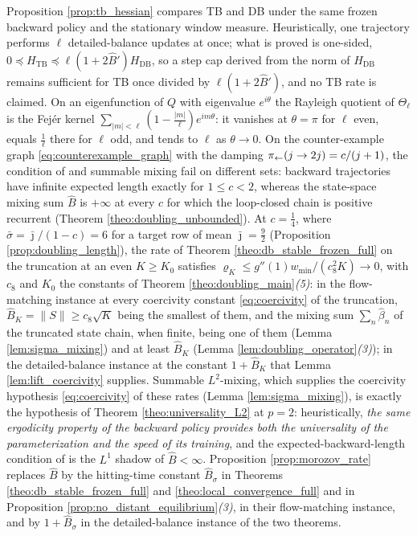 \begin{remark}\label{rem:tb_vs_db}
Proposition \ref{prop:tb_hessian} compares TB and DB under the same frozen backward policy and the stationary window measure. Heuristically, one trajectory performs $\ell$ detailed-balance updates at once; what is proved is one-sided, $0\preceq H_{\mathrm{TB}}\preceq\ell(1+2\widehat B')H_{\mathrm{DB}}$, so a step cap derived from the norm of $H_{\mathrm{DB}}$ remains sufficient for TB once divided by $\ell(1+2\widehat B')$, and no TB rate is claimed. On an eigenfunction of $Q$ with eigenvalue $e^{i\theta}$ the Rayleigh quotient of $\Theta_\ell$ is the Fej\'er kernel $\sum_{|m|<\ell}(1-\frac{|m|}\ell)e^{im\theta}$: it vanishes at $\theta=\pi$ for $\ell$ even, equals $\frac1\ell$ there for $\ell$ odd, and tends to $\ell$ as $\theta\rightarrow0$. On the counter-example graph \eqref{eq:counterexample_graph} with the damping $\pi_{\leftarrow}(j\rightarrow2j)=c/(j+1)$, the condition of \citet{morozov2025revisiting} and summable mixing fail on different sets: backward trajectories have infinite expected length exactly for $1\leq c<2$, whereas the state-space mixing sum $\widehat B$ is $+\infty$ at every $c$ for which the loop-closed chain is positive recurrent (Theorem \ref{theo:doubling_unbounded}). At $c=\frac14$, where $\bar\sigma=\bar\jmath/(1-c)=6$ for a target row of mean $\bar\jmath=\frac92$ (Proposition \ref{prop:doubling_length}), the rate of Theorem \ref{theo:db_stable_frozen_full} on the truncation at an even $K\geq K_0$ satisfies $\varrho_K\leq g''(1)w_{\min}/(c_8^2K)\rightarrow0$, with $c_8$ and $K_0$ the constants of Theorem \ref{theo:doubling_main}\emph{(5)}: in the flow-matching instance at every coercivity constant \eqref{eq:coercivity} of the truncation, $\widehat B_K=\|S\|\geq c_8\sqrt K$ being the smallest of them, and the mixing sum $\sum_n\widehat\beta_n$ of the truncated state chain, when finite, being one of them (Lemma \ref{lem:sigma_mixing}) and at least $\widehat B_K$ (Lemma \ref{lem:doubling_operator}\emph{(3)}); in the detailed-balance instance at the constant $1+\widehat B_K$ that Lemma \ref{lem:lift_coercivity} supplies. Summable $L^2$-mixing, which supplies the coercivity hypothesis \eqref{eq:coercivity} of these rates (Lemma \ref{lem:sigma_mixing}), is exactly the hypothesis of Theorem \ref{theo:universality_L2} at $p=2$: heuristically, \emph{the same ergodicity property of the backward policy provides both the universality of the parameterization and the speed of its training}, and the expected-backward-length condition of \citet{morozov2025revisiting} is the $L^1$ shadow of $\widehat B<\infty$. Proposition \ref{prop:morozov_rate} replaces $\widehat B$ by the hitting-time constant $\widehat B_\sigma$ in Theorems \ref{theo:db_stable_frozen_full} and \ref{theo:local_convergence_full} and in Proposition \ref{prop:no_distant_equilibrium}\emph{(3)}, in their flow-matching instance, and by $1+\widehat B_\sigma$ in the detailed-balance instance of the two theorems.
\end{remark}

